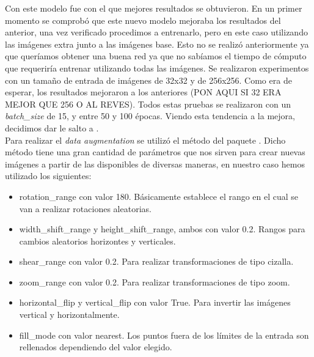 Con este modelo fue con el que mejores resultados se obtuvieron. En un primer momento se comprobó que este nuevo modelo mejoraba los resultados del anterior, una vez verificado procedimos a entrenarlo, pero en este caso utilizando las imágenes extra junto a las imágenes base. Esto no se realizó anteriormente ya que queríamos obtener una buena red ya que no sabíamos el tiempo de cómputo que requeriría entrenar utilizando todas las imágenes. Se realizaron experimentos con un tamaño de entrada de imágenes de 32x32 y de 256x256. Como era de esperar, los resultados mejoraron a los anteriores (PON AQUI SI 32 ERA MEJOR QUE 256 O AL REVES). Todos estas pruebas se realizaron con un
\textit{batch\_size} de 15, y entre 50 y 100 épocas. Viendo esta tendencia a la mejora, decidimos dar le salto a .\\

Para realizar el \textit{data augmentation} se utilizó el método  del paquete . Dicho método tiene una gran cantidad de parámetros que nos sirven para crear nuevas imágenes a partir de las disponibles de diversas maneras, en nuestro caso hemos utilizado los siguientes:

\begin{itemize}
\item rotation\_range con valor 180. Básicamente establece el rango en el cual se van a realizar rotaciones aleatorias.
\item width\_shift\_range y height\_shift\_range, ambos con valor 0.2. Rangos para cambios aleatorios horizontes y verticales.
\item shear\_range con valor 0.2. Para realizar transformaciones de tipo cizalla.
\item zoom\_range con valor 0.2. Para realizar transformaciones de tipo zoom.
\item horizontal\_flip y vertical\_flip con valor True. Para invertir las imágenes vertical y horizontalmente.
\item fill\_mode con valor nearest. Los puntos fuera de los límites de la entrada son rellenados dependiendo del valor elegido.
\end{itemize}

